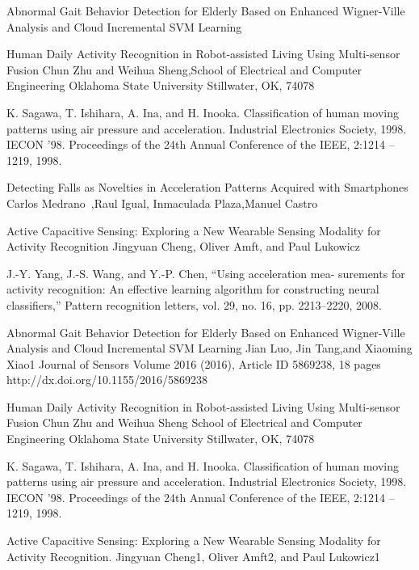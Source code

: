 \documentclass[a4paper, parskip=full]{scrartcl}
\begin{document}
\begin{thebibliography}{9}
 Abnormal Gait Behavior Detection for Elderly Based on Enhanced Wigner-Ville Analysis and Cloud Incremental SVM Learning
 

Human Daily Activity Recognition in Robot-assisted Living Using Multi-sensor Fusion
Chun Zhu and Weihua Sheng,School of Electrical and Computer Engineering
Oklahoma State University Stillwater, OK, 74078


K. Sagawa, T. Ishihara, A. Ina, and H. Inooka. Classification of human moving patterns using air pressure and acceleration. Industrial Electronics Society, 1998. IECON ’98. Proceedings of the 24th Annual Conference of the IEEE, 2:1214 – 1219, 1998.

Detecting Falls as Novelties in Acceleration Patterns Acquired with Smartphones
Carlos Medrano ,Raul Igual, Inmaculada Plaza,Manuel Castro

Active Capacitive Sensing: Exploring a New Wearable Sensing Modality for Activity Recognition Jingyuan Cheng, Oliver Amft, and Paul Lukowicz

J.-Y. Yang, J.-S. Wang, and Y.-P. Chen, “Using acceleration mea-
surements for activity recognition: An effective learning algorithm for
constructing neural classifiers,” Pattern recognition letters, vol. 29,
no. 16, pp. 2213–2220, 2008.


Abnormal Gait Behavior Detection for Elderly Based on Enhanced Wigner-Ville Analysis and Cloud Incremental SVM Learning
Jian Luo, Jin Tang,and Xiaoming Xiao1
Journal of Sensors Volume 2016 (2016), Article ID 5869238, 18 pages
http://dx.doi.org/10.1155/2016/5869238



Human Daily Activity Recognition in Robot-assisted Living Using Multi-sensor Fusion
Chun Zhu and Weihua Sheng
School of Electrical and Computer Engineering Oklahoma State University
Stillwater, OK, 74078



K. Sagawa, T. Ishihara, A. Ina, and H. Inooka. Classification of human moving patterns using air pressure and acceleration. Industrial Electronics Society, 1998. IECON ’98. Proceedings of the 24th Annual Conference of the IEEE, 2:1214 – 1219, 1998.


Active Capacitive Sensing: Exploring a New Wearable Sensing Modality for Activity Recognition. Jingyuan Cheng1, Oliver Amft2, and Paul Lukowicz1



\end{thebibliography}
\end{document}
